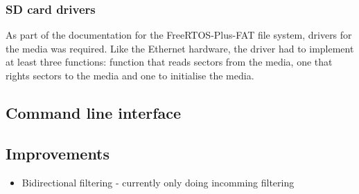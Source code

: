\subsubsection{SD card drivers}
As part of the documentation for the FreeRTOS-Plus-FAT file system, drivers for the media was required. Like the Ethernet hardware, the driver had to implement at least three functions: function that reads sectors from the media, one that rights sectors to the media and one to initialise the media. 





\subsection{Command line interface}


\subsection{Improvements}

\begin{itemize}
    \item Bidirectional filtering - currently only doing incomming filtering
\end{itemize}